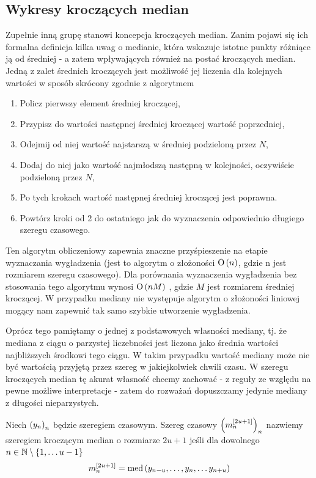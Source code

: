 \documentclass[10pt,a4paper]{book}
\begin{document}
\subsection{Wykresy kroczących median}

Zupełnie inną grupę stanowi koncepcja kroczących median. Zanim pojawi się ich formalna definicja kilka uwag o medianie, która wskazuje istotne punkty różniące ją od średniej - a zatem wpływających również na postać kroczących median. Jedną z zalet średnich kroczących jest możliwość jej liczenia dla kolejnych wartości w sposób skrócony zgodnie z algorytmem

\begin{enumerate}
\item Policz pierwszy element średniej kroczącej,
\item Przypisz do wartości następnej średniej kroczącej wartość poprzedniej,
\item Odejmij od niej wartość najstarszą w średniej podzieloną przez $N$,
\item Dodaj do niej jako wartość najmłodszą następną w kolejności, oczywiście podzieloną przez $N$,
\item Po tych krokach wartość następnej średniej kroczącej jest poprawna.
\item Powtórz kroki od 2 do ostatniego jak do wyznaczenia odpowiednio długiego szeregu czasowego.
\end{enumerate}

Ten algorytm obliczeniowy zapewnia znaczne przyśpieszenie na etapie wyznaczania wygładzenia (jest to algorytm o złożoności $\operatorname{O} \left( {n} \right)$, gdzie n jest rozmiarem szeregu czasowego). Dla porównania wyznaczenia wygładzenia bez stosowania tego algorytmu wynosi $\operatorname{O} \left( {n M} \right)$ , gdzie $M$ jest rozmiarem średniej kroczącej. W przypadku mediany nie występuje algorytm o złożoności liniowej mogący nam zapewnić tak samo szybkie utworzenie wygładzenia.

Oprócz tego pamiętamy o jednej z podstawowych własności mediany, tj. że mediana z ciągu o parzystej liczebności jest liczona jako średnia wartości najbliższych środkowi tego ciągu. W takim przypadku wartość mediany może nie być wartością przyjętą przez szereg w jakiejkolwiek chwili czasu.  W szeregu kroczących median tę akurat własność chcemy zachować - z reguły ze względu na pewne możliwe interpretacje - zatem do rozważań dopuszczamy jedynie mediany z długości nieparzystych.

\begin{definition}
Niech $\left( {y_n} \right)_{n}^{} $ będzie szeregiem czasowym. Szereg czasowy $\left( {m^{[2u+1]}_n} \right)_{n}^{}$ nazwiemy szeregiem kroczącym median o rozmiarze $2u+1$ jeśli dla dowolnego $n \in \mathbb{N} \setminus \left\lbrace {1,\ldots u-1} \right\rbrace $
$$
m^{[2u+1]}_n = \median{y_{n-u}, \ldots, y_n, \ldots y_{n+u}}
$$  
\end{definition}
\end{document}

